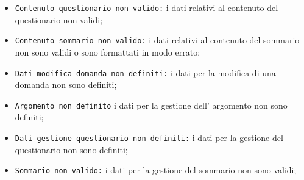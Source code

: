 \begin{itemize}
	\item \texttt{Contenuto questionario non valido:} i dati relativi al contenuto del questionario non validi;
	\item \texttt{Contenuto sommario non valido:} i dati relativi al contenuto del  sommario non sono validi o sono formattati in modo errato;
	\item \texttt{Dati modifica domanda non definiti:} i dati per la modifica di una domanda non sono definiti;
	\item \texttt{Argomento non definito} i dati per la gestione dell' argomento non sono definiti;
	\item \texttt{Dati gestione questionario non definiti:} i dati per la gestione del questionario non sono definiti;
	\item \texttt{Sommario non valido:} i dati per la gestione del sommario non sono validi;
\end{itemize} 